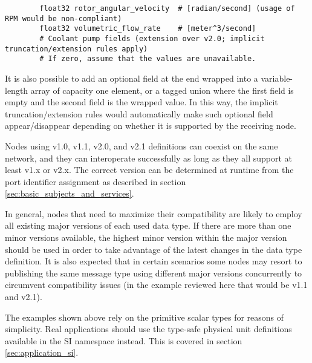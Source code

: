 \begin{remark}[breakable]
\begin{verbatim}
        float32 rotor_angular_velocity  # [radian/second] (usage of RPM would be non-compliant)
        float32 volumetric_flow_rate    # [meter^3/second]
        # Coolant pump fields (extension over v2.0; implicit truncation/extension rules apply)
        # If zero, assume that the values are unavailable.
    \end{verbatim}

    It is also possible to add an optional field at the end wrapped into a variable-length
    array of capacity one element, or a tagged union where the first field is empty
    and the second field is the wrapped value.
    In this way, the implicit truncation/extension rules would automatically make such optional field
    appear/disappear depending on whether it is supported by the receiving node.

    Nodes using v1.0, v1.1, v2.0, and v2.1 definitions can coexist on the same network,
    and they can interoperate successfully as long as they all support at least v1.x or v2.x.
    The correct version can be determined at runtime from the port identifier assignment as described in section
    \ref{sec:basic_subjects_and_services}.

    In general, nodes that need to maximize their compatibility are likely to employ all existing major versions of
    each used data type.
    If there are more than one minor versions available, the highest minor version within the major version should
    be used in order to take advantage of the latest changes in the data type definition.
    It is also expected that in certain scenarios some nodes may resort to publishing the same message type
    using different major versions concurrently to circumvent compatibility issues
    (in the example reviewed here that would be v1.1 and v2.1).

    The examples shown above rely on the primitive scalar types for reasons of simplicity.
    Real applications should use the type-safe physical unit definitions available in the SI namespace instead.
    This is covered in section \ref{sec:application_si}.
\end{remark}

